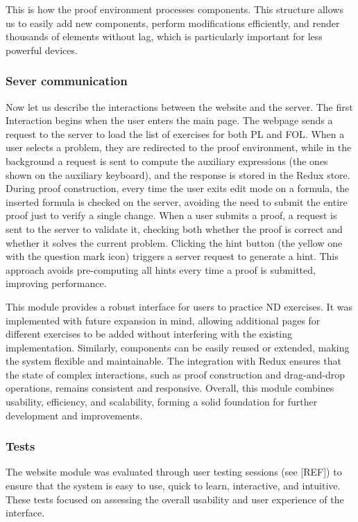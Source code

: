 This is how the proof environment processes components. This structure allows us to easily add new components, perform modifications efficiently, and render thousands of elements without lag, which is particularly important for less powerful devices.

\subsubsection{Sever communication}
Now let us describe the interactions between the website and the server. The first Interaction begins when the user enters the main page. The webpage sends a request to the server to load the list of exercises for both \gls{PL} and \gls{FOL}. When a user selects a problem, they are redirected to the proof environment, while in the background a request is sent to compute the auxiliary expressions (the ones shown on the auxiliary keyboard), and the response is stored in the Redux store. During proof construction, every time the user exits edit mode on a formula, the inserted formula is checked on the server, avoiding the need to submit the entire proof just to verify a single change. When a user submits a proof, a request is sent to the server to validate it, checking both whether the proof is correct and whether it solves the current problem. Clicking the hint button (the yellow one with the question mark icon) triggers a server request to generate a hint. This approach avoids pre-computing all hints every time a proof is submitted, improving performance.

This module provides a robust interface for users to practice \gls{ND} exercises. It was implemented with future expansion in mind, allowing additional pages for different exercises to be added without interfering with the existing implementation. Similarly, components can be easily reused or extended, making the system flexible and maintainable. The integration with Redux ensures that the state of complex interactions, such as proof construction and drag-and-drop operations, remains consistent and responsive. Overall, this module combines usability, efficiency, and scalability, forming a solid foundation for further development and improvements.

\subsubsection{Tests}
The website module was evaluated through user testing sessions (see [REF]) to ensure that the system is easy to use, quick to learn, interactive, and intuitive. These tests focused on assessing the overall usability and user experience of the interface.
